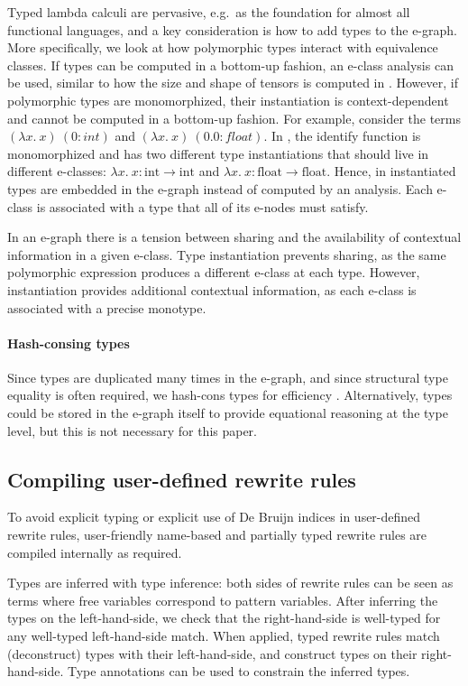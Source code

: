 Typed lambda calculi are pervasive, e.g.~as the foundation for almost all functional languages, and a key consideration is how to add types to the e-graph.
More specifically, we look at how polymorphic types interact with equivalence classes.
If types can be computed in a bottom-up fashion, an e-class analysis can be used, similar to how the size and shape of tensors is computed in \cite{wang2020-spores}.
However, if polymorphic types are monomorphized, their instantiation is context-dependent and cannot be computed in a bottom-up fashion.
For example, consider the terms $(\lambda x.~x)~(0: int)$ and $(\lambda x.~x)~(0.0: float)$.
In \Rise{}, the identify function is monomorphized and has two different type instantiations that should live in different e-classes: $\lambda x.~x : \text{int} \rightarrow \text{int}$ and $\lambda x.~x : \text{float} \rightarrow \text{float}$.
Hence, in \kles{} instantiated types are embedded in the e-graph instead of computed by an analysis.
Each e-class is associated with a type that all of its e-nodes must satisfy.

In an e-graph there is a tension between sharing and the availability of contextual information in a given e-class.
Type instantiation prevents sharing, as the same polymorphic expression produces a different e-class at each type. However, instantiation provides additional contextual information, as each e-class is associated with a precise monotype.

\paragraph{Hash-consing types}
Since types are duplicated many times in the e-graph, and since structural type equality is often required, we hash-cons types for efficiency \cite{filliatre2006-hashconsing}.
Alternatively, types could be stored in the e-graph itself to provide equational reasoning at the type level, but this is not necessary for this paper.

\subsection{Compiling user-defined rewrite rules}
\label{rewrite-example}

To avoid explicit typing or explicit use of De Bruijn indices in user-defined rewrite rules, user-friendly name-based and partially typed rewrite rules are compiled internally as required.

Types are inferred with \Rise{} type inference: both sides of rewrite rules can be seen as terms where free variables correspond to pattern variables.
After inferring the types on the left-hand-side, we check that the right-hand-side is well-typed for any well-typed left-hand-side match.
When applied, typed rewrite rules match (deconstruct) types with their left-hand-side, and construct types on their right-hand-side.
Type annotations can be used to constrain the inferred types.

